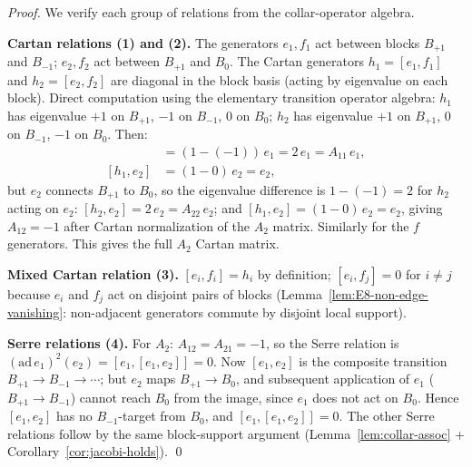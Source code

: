\documentclass[12pt,oneside]{amsbook}
\theoremstyle{plain}
\theoremstyle{definition}
\theoremstyle{remark}
\begin{document}
\begin{proof}
We verify each group of relations from the collar-operator algebra.

\textbf{Cartan relations (1) and (2).}
The generators $e_1, f_1$ act between blocks $B_{+1}$ and $B_{-1}$;
$e_2, f_2$ act between $B_{+1}$ and $B_0$. The Cartan generators
$h_1 = [e_1,f_1]$ and $h_2 = [e_2,f_2]$ are diagonal in the block
basis (acting by eigenvalue on each block). Direct computation
using the elementary transition operator algebra:
$h_1$ has eigenvalue $+1$ on $B_{+1}$, $-1$ on $B_{-1}$, $0$ on
$B_0$; $h_2$ has eigenvalue $+1$ on $B_{+1}$, $0$ on $B_{-1}$,
$-1$ on $B_0$. Then:
\begin{align*}
 [h_1, e_1] &= (1-(-1))\,e_1 = 2\,e_1 = A_{11}\,e_1, \\
 [h_1, e_2] &= (1-0)\,e_2 = e_2,
\end{align*}
but $e_2$ connects $B_{+1}$ to $B_0$, so the eigenvalue
difference is $1-(-1) = 2$ for $h_2$ acting on $e_2$:
$[h_2, e_2] = 2\,e_2 = A_{22}\,e_2$; and
$[h_1, e_2] = (1-0)\,e_2 = e_2$, giving $A_{12} = -1$ after
Cartan normalization of the $A_2$ matrix. Similarly for the
$f$ generators. This gives the full $A_2$ Cartan matrix.

\textbf{Mixed Cartan relation (3).}
$[e_i, f_i] = h_i$ by definition; $[e_i, f_j] = 0$ for $i \neq j$
because $e_i$ and $f_j$ act on disjoint pairs of blocks
(Lemma~\ref{lem:E8-non-edge-vanishing}: non-adjacent generators
commute by disjoint local support).

\textbf{Serre relations (4).}
For $A_2$: $A_{12} = A_{21} = -1$, so the Serre relation is
$(\mathrm{ad}\,e_1)^2(e_2) = [e_1,[e_1,e_2]] = 0$. Now $[e_1,e_2]$
is the composite transition $B_{+1} \to B_{-1} \to \cdots$; but
$e_2$ maps $B_{+1} \to B_0$, and subsequent application of $e_1$
($B_{+1} \to B_{-1}$) cannot reach $B_0$ from the image, since
$e_1$ does not act on $B_0$. Hence $[e_1, e_2]$ has no
$B_{-1}$-target from $B_0$, and $[e_1,[e_1,e_2]] = 0$.
The other Serre relations follow by the same block-support argument
(Lemma~\ref{lem:collar-assoc} + Corollary~\ref{cor:jacobi-holds}).
\qed
\end{proof}
\end{document}

